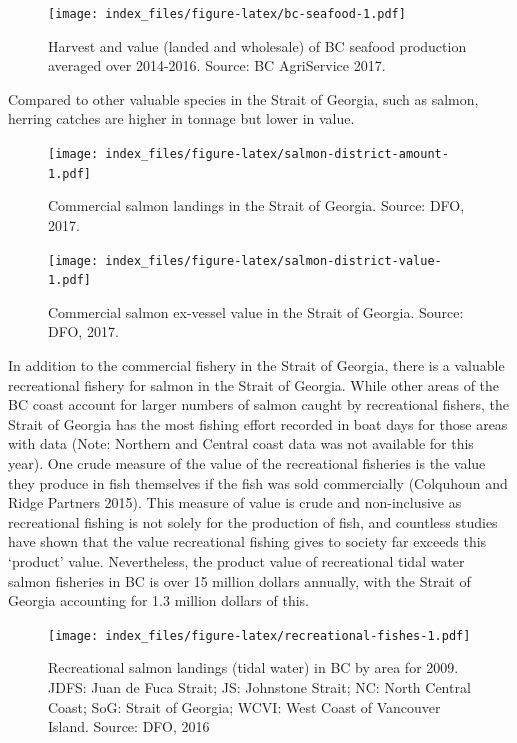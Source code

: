 \documentclass[]{article}
\theoremstyle{definition}
\theoremstyle{definition}
\theoremstyle{definition}
\theoremstyle{remark}
\begin{document}
\begin{figure}
\centering
\texttt{[image: index\_files/figure-latex/bc-seafood-1.pdf]}
\caption{\label{fig:bc-seafood}Harvest and value (landed and wholesale) of
BC seafood production averaged over 2014-2016. Source: BC AgriService
2017.}
\end{figure}

Compared to other valuable species in the Strait of Georgia, such as
salmon, herring catches are higher in tonnage but lower in value.

\begin{figure}
\centering
\texttt{[image: index\_files/figure-latex/salmon-district-amount-1.pdf]}
\caption{\label{fig:salmon-district-amount}Commercial salmon landings in the
Strait of Georgia. Source: DFO, 2017.}
\end{figure}

\begin{figure}
\centering
\texttt{[image: index\_files/figure-latex/salmon-district-value-1.pdf]}
\caption{\label{fig:salmon-district-value}Commercial salmon ex-vessel value
in the Strait of Georgia. Source: DFO, 2017.}
\end{figure}

In addition to the commercial fishery in the Strait of Georgia, there is
a valuable recreational fishery for salmon in the Strait of Georgia.
While other areas of the BC coast account for larger numbers of salmon
caught by recreational fishers, the Strait of Georgia has the most
fishing effort recorded in boat days for those areas with data (Note:
Northern and Central coast data was not available for this year). One
crude measure of the value of the recreational fisheries is the value
they produce in fish themselves if the fish was sold commercially
(Colquhoun and Ridge Partners 2015). This measure of value is crude and
non-inclusive as recreational fishing is not solely for the production
of fish, and countless studies have shown that the value recreational
fishing gives to society far exceeds this `product' value. Nevertheless,
the product value of recreational tidal water salmon fisheries in BC is
over 15 million dollars annually, with the Strait of Georgia accounting
for 1.3 million dollars of this.

\begin{figure}
\centering
\texttt{[image: index\_files/figure-latex/recreational-fishes-1.pdf]}
\caption{\label{fig:recreational-fishes}Recreational salmon landings (tidal
water) in BC by area for 2009. JDFS: Juan de Fuca Strait; JS: Johnstone
Strait; NC: North Central Coast; SoG: Strait of Georgia; WCVI: West
Coast of Vancouver Island. Source: DFO, 2016}
\end{figure}
\end{document}
